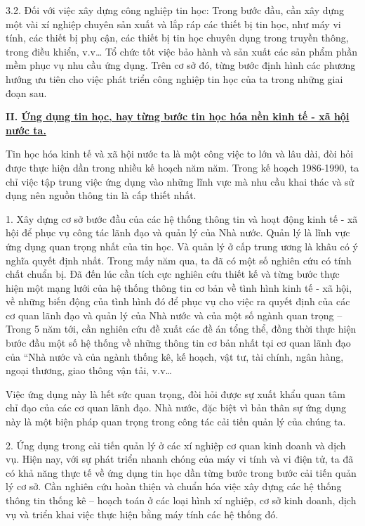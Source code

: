 \documentclass[11pt, a4paper, reqno, oneside]{book}
\begin{document}
 
 3.2. Đối với việc xây dựng công nghiệp tin học: Trong bước đầu, cần xây dựng một vài xí nghiệp chuyên sản xuất và lắp ráp các thiết bị tin học, như máy vi tính, các thiết bị phụ cận, các thiết bị tin học chuyên dụng trong truyền thông, trong điều khiển, v.v… Tổ chức tốt việc bảo hành và sản xuất các sản phẩm phần mềm phục vụ nhu cầu ứng dụng. Trên cơ sở đó, từng bước định hình các phương hướng ưu tiên cho việc phát triển công nghiệp tin học của ta trong những giai đoạn sau.
 
 
\textbf{II.	\underline{  Ứng dụng tin học, hay từng bước tin học hóa nền kinh tế - xã hội nước ta.}}

 Tin học hóa kinh tế và xã hội nước ta là một công việc to lớn và lâu dài, đòi hỏi được thực hiện dần trong nhiều kế hoạch năm năm. Trong kế hoạch 1986-1990, ta chỉ việc tập trung việc ứng dụng vào những lĩnh vực mà nhu cầu khai thác và sử dụng nên nguồn thông tin là cấp thiết nhất.
 
 
1.	Xây dựng cơ sở bước đầu của các hệ thống thông tin và hoạt động kinh tế - xã hội để phục vụ công tác lãnh đạo và quản lý của Nhà nước. Quản lý là lĩnh vực ứng dụng quan trọng nhất của tin học. Và quản lý ở cấp trung ương là khâu có ý nghĩa quyết định nhất. Trong mấy năm qua, ta đã có một số nghiên cứu có tính chất chuẩn bị. Đã đến lúc cần tích cực nghiên cứu thiết kế và từng bước thực hiện một mạng lưới của hệ thống thông tin cơ bản về tình hình kinh tế - xã hội, về những biến động của tình hình đó để phục vụ cho việc ra quyết định của các cơ quan lãnh đạo và quản lý của Nhà nước và của một số ngành quan trọng – Trong 5 năm tới, cần nghiên cứu đề xuất các đề án tổng thể, đồng thời thực hiện bước đầu một số hệ thống về những thông tin cơ bản nhất tại cơ quan lãnh đạo của “Nhà nước và của ngành thống kê, kế hoạch, vật tư, tài chính, ngân hàng, ngoại thương, giao thông vận tải, v.v…


Việc ứng dụng này là hết sức quan trọng, đòi hỏi được sự xuất khẩu quan tâm chỉ đạo của các cơ quan lãnh đạo. Nhà nước, đặc biệt vì bản thân sự ứng dụng này là một biện pháp quan trọng trong công tác cải tiến quản lý của chúng ta.


2.	Ứng dụng trong cải tiến quản lý ở các xí nghiệp cơ quan kinh doanh và dịch vụ. Hiện nay, với sự phát triển nhanh chóng của máy vi tính và vi điện tử, ta đã có khả năng thực tế về ứng dụng tin học dần từng bước trong bước cải tiến quản lý cơ sở. Cần nghiên cứu hoàn thiện và chuẩn hóa việc xây dựng các hệ thống thông tin thống kê – hoạch toán ở các loại hình xí nghiệp, cơ sở kinh doanh, dịch vụ và triển khai việc thực hiện bằng máy tính các hệ thống đó.
\end{document}
